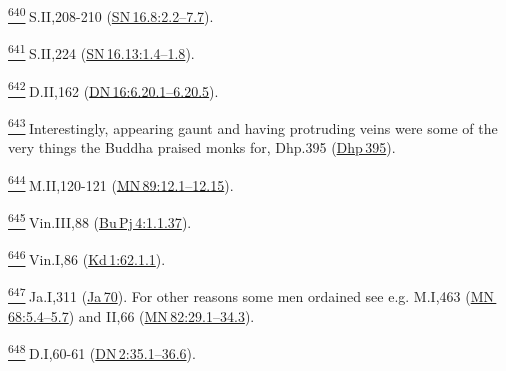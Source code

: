 \label{footprints_split_025.html_fn640}
\hyperref[footprints_split_016.htmlux5cux23fnref640]{\textsuperscript{640}} S.II,208-210
(\href{https://suttacentral.net/sn16.8/en/sujato\#2.2}{SN\,16.8:2.2--7.7}).

\label{footprints_split_025.html_fn641}
\hyperref[footprints_split_016.htmlux5cux23fnref641]{\textsuperscript{641}} S.II,224
(\href{https://suttacentral.net/sn16.13/en/sujato\#1.4}{SN\,16.13:1.4--1.8}).

\label{footprints_split_025.html_fn642}
\hyperref[footprints_split_016.htmlux5cux23fnref642]{\textsuperscript{642}} D.II,162
(\href{https://suttacentral.net/dn16/en/sujato\#6.20.1}{DN\,16:6.20.1--6.20.5}).

\label{footprints_split_025.html_fn643}
\hyperref[footprints_split_016.htmlux5cux23fnref643]{\textsuperscript{643}} Interestingly,
appearing gaunt and having protruding veins were some of the very things
the Buddha praised monks for, Dhp.395
(\href{https://suttacentral.net/dhp395/en/sujato}{Dhp\,395}).

\label{footprints_split_025.html_fn644}
\hyperref[footprints_split_016.htmlux5cux23fnref644]{\textsuperscript{644}} M.II,120-121
(\href{https://suttacentral.net/mn89/en/sujato\#12.1}{MN\,89:12.1--12.15}).

\label{footprints_split_025.html_fn645}
\hyperref[footprints_split_016.htmlux5cux23fnref645]{\textsuperscript{645}} Vin.III,88
(\href{https://suttacentral.net/pli-tv-bu-vb-pj4/en/brahmali\#1.1.37}{Bu\,Pj\,4:1.1.37}).

\label{footprints_split_025.html_fn646}
\hyperref[footprints_split_016.htmlux5cux23fnref646]{\textsuperscript{646}} Vin.I,86
(\href{https://suttacentral.net/pli-tv-kd1/en/brahmali\#62.1.1}{Kd\,1:62.1.1}).

\label{footprints_split_025.html_fn647}
\hyperref[footprints_split_016.htmlux5cux23fnref647]{\textsuperscript{647}} Ja.I,311
(\href{https://suttacentral.net/ja70}{Ja\,70}). For other reasons some
men ordained see e.g. M.I,463
(\href{https://suttacentral.net/mn68/en/sujato\#5.4}{MN\,68:5.4--5.7})
and II,66
(\href{https://suttacentral.net/mn82/en/sujato\#29.1}{MN\,82:29.1--34.3}).

\label{footprints_split_025.html_fn648}
\hyperref[footprints_split_016.htmlux5cux23fnref648]{\textsuperscript{648}} D.I,60-61
(\href{https://suttacentral.net/dn2/en/sujato\#35.1}{DN\,2:35.1--36.6}).

